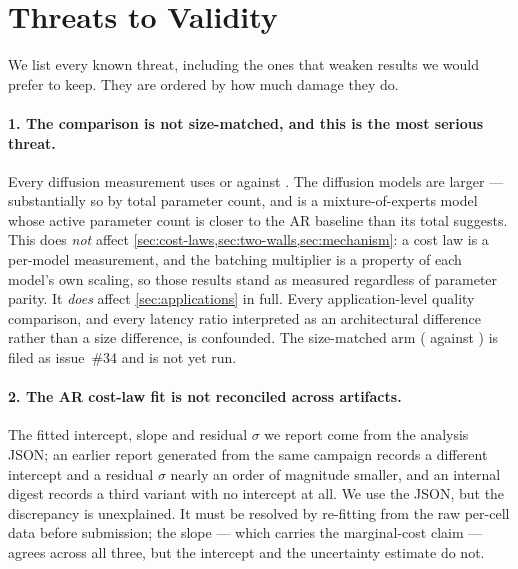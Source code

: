 %
\section{Threats to Validity}
\label{sec:threats}

We list every known threat, including the ones that weaken results we would
prefer to keep. They are ordered by how much damage they do.

\paragraph{1. The comparison is not size-matched, and this is the most serious
threat.} Every diffusion measurement uses \modelLLaDA{} or \modelDG{} against
\modelARthree. The diffusion models are larger --- substantially so by total
parameter count, and \modelDG{} is a mixture-of-experts model whose active
parameter count is closer to the AR baseline than its total suggests. This does
\emph{not} affect \cref{sec:cost-laws,sec:two-walls,sec:mechanism}: a cost law is a
per-model measurement, and the batching multiplier is a property of each model's
own scaling, so those results stand as measured regardless of parameter parity.
It \emph{does} affect \cref{sec:applications} in full. Every application-level
quality comparison, and every latency ratio interpreted as an architectural
difference rather than a size difference, is confounded. The size-matched arm
(\modelDG{} against \modelARseven) is filed as issue~\#34 and is not yet run.

\paragraph{2. The AR cost-law fit is not reconciled across artifacts.} The
fitted intercept, slope and residual $\sigma$ we report come from the analysis
JSON; an earlier report generated from the same campaign records a different
intercept and a residual $\sigma$ nearly an order of magnitude smaller, and an
internal digest records a third variant with no intercept at all. We use the
JSON, but the discrepancy is unexplained. It must be resolved by re-fitting from
the raw per-cell data before submission; the slope --- which carries the
marginal-cost claim --- agrees across all three, but the intercept and the
uncertainty estimate do not. 

